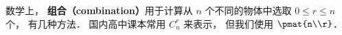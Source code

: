 
数学上， \textbf{组合（combination）}用于计算从 $n$ 个不同的物体中选取 $0 \leqslant r \leqslant n$ 个， 有几种方法． 国内高中课本常用 $C_n^r$ 来表示， 但我们使用 $\pmat{n\\r}$．
